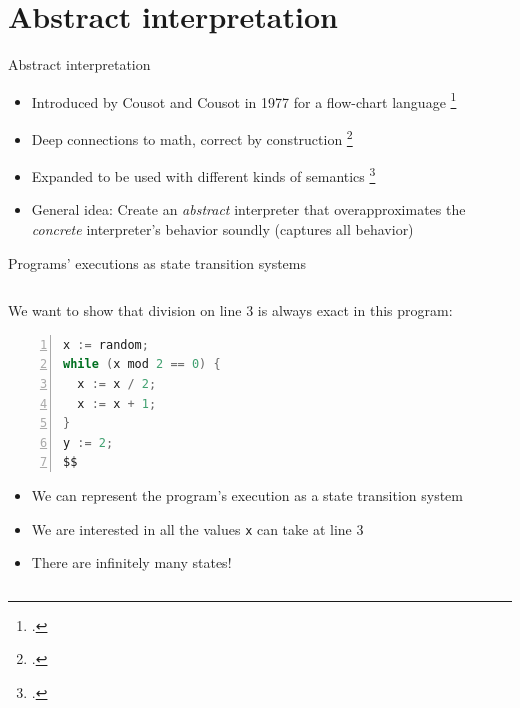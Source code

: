 \documentclass[aspectratio=169]{beamer}
\begin{document}

\section{Abstract interpretation}

\begin{frame}{Abstract interpretation}
  \begin{itemize}[<+->]
  \item Introduced by Cousot and Cousot in 1977 for a flow-chart language \footcite{cousot1977abstract}
  \item Deep connections to math, correct by construction \footcite{cousot1979systematic}
  \item Expanded to be used with different kinds of semantics \footcite{schmidt1998trace,schmidt2009abstract,van2010abstracting,van2012systematic}
  \item General idea: Create an \emph{abstract} interpreter that
    overapproximates the \emph{concrete} interpreter's behavior
    soundly (captures all behavior)
  \end{itemize}
\end{frame}

\begin{frame}[fragile]{Programs' executions as state transition systems}
  \footnotesize
  \begin{columns}[T]
    \begin{column}{0.45\textwidth}
      We want to show that division on line 3 is always exact in this program:

      \begin{lstlisting}[language=Java,numbers=left,mathescape,basicstyle={\footnotesize\ttfamily}]
x := random;
while (x mod 2 == 0) {
  x := x / 2;
  x := x + 1;
}
y := 2;
$$
\end{lstlisting}
\begin{itemize}
\item<2-> We can represent the program's execution as a state transition system
\item<10-> We are interested in all the values \texttt{x} can take at line 3
\item<11-> There are infinitely many states!
\end{itemize}
    \end{column}
    \begin{column}{0.5\textwidth}
    \end{column}

  \end{columns}
\end{frame}
\end{document}
